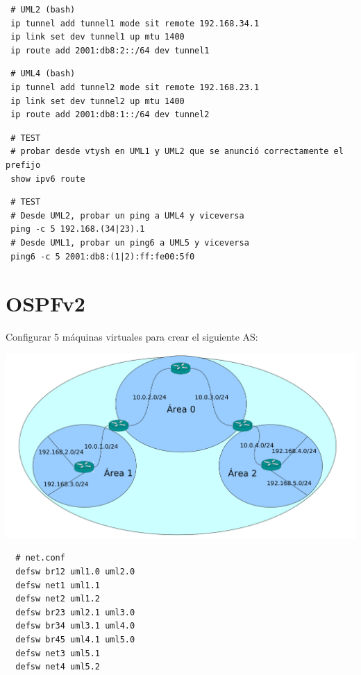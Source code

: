 \documentclass{article}
\begin{document}
\begin{verbatim}
 # UML2 (bash)
 ip tunnel add tunnel1 mode sit remote 192.168.34.1
 ip link set dev tunnel1 up mtu 1400
 ip route add 2001:db8:2::/64 dev tunnel1
\end{verbatim}

\begin{verbatim}
 # UML4 (bash)
 ip tunnel add tunnel2 mode sit remote 192.168.23.1
 ip link set dev tunnel2 up mtu 1400
 ip route add 2001:db8:1::/64 dev tunnel2
\end{verbatim}

\begin{verbatim}
 # TEST
 # probar desde vtysh en UML1 y UML2 que se anunció correctamente el prefijo
 show ipv6 route
\end{verbatim}

\begin{verbatim}
 # TEST
 # Desde UML2, probar un ping a UML4 y viceversa
 ping -c 5 192.168.(34|23).1
 # Desde UML1, probar un ping6 a UML5 y viceversa
 ping6 -c 5 2001:db8:(1|2):ff:fe00:5f0
\end{verbatim}


\section{OSPFv2}

Configurar 5 máquinas virtuales para crear el siguiente AS:

\includegraphics[width=\textwidth]{ospfv2}

\begin{verbatim}
  # net.conf
  defsw br12 uml1.0 uml2.0
  defsw net1 uml1.1
  defsw net2 uml1.2
  defsw br23 uml2.1 uml3.0
  defsw br34 uml3.1 uml4.0
  defsw br45 uml4.1 uml5.0
  defsw net3 uml5.1
  defsw net4 uml5.2
\end{verbatim}
\end{document}
